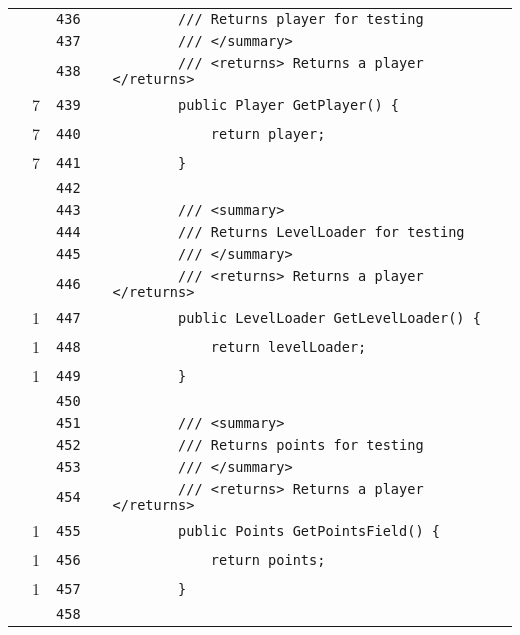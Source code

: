 \documentclass[a4paper,landscape,10pt]{article}
\begin{document}
\begin{longtable}[l]{lrrll}
\cellcolor{gray} &  & \verb~436~ & & \verb~        /// Returns player for testing~\\
\cellcolor{gray} &  & \verb~437~ & & \verb~        /// </summary>~\\
\cellcolor{gray} &  & \verb~438~ & & \verb~        /// <returns> Returns a player </returns>~\\
\cellcolor{green} & 7 & \verb~439~ & & \verb~        public Player GetPlayer() {~\\
\cellcolor{green} & 7 & \verb~440~ & & \verb~            return player;~\\
\cellcolor{green} & 7 & \verb~441~ & & \verb~        }~\\
\cellcolor{gray} &  & \verb~442~ & & \verb~~\\
\cellcolor{gray} &  & \verb~443~ & & \verb~        /// <summary>~\\
\cellcolor{gray} &  & \verb~444~ & & \verb~        /// Returns LevelLoader for testing~\\
\cellcolor{gray} &  & \verb~445~ & & \verb~        /// </summary>~\\
\cellcolor{gray} &  & \verb~446~ & & \verb~        /// <returns> Returns a player </returns>~\\
\cellcolor{green} & 1 & \verb~447~ & & \verb~        public LevelLoader GetLevelLoader() {~\\
\cellcolor{green} & 1 & \verb~448~ & & \verb~            return levelLoader;~\\
\cellcolor{green} & 1 & \verb~449~ & & \verb~        }~\\
\cellcolor{gray} &  & \verb~450~ & & \verb~~\\
\cellcolor{gray} &  & \verb~451~ & & \verb~        /// <summary>~\\
\cellcolor{gray} &  & \verb~452~ & & \verb~        /// Returns points for testing~\\
\cellcolor{gray} &  & \verb~453~ & & \verb~        /// </summary>~\\
\cellcolor{gray} &  & \verb~454~ & & \verb~        /// <returns> Returns a player </returns>~\\
\cellcolor{green} & 1 & \verb~455~ & & \verb~        public Points GetPointsField() {~\\
\cellcolor{green} & 1 & \verb~456~ & & \verb~            return points;~\\
\cellcolor{green} & 1 & \verb~457~ & & \verb~        }~\\
\cellcolor{gray} &  & \verb~458~ & & \verb~~\\

\end{longtable}
\end{document}
